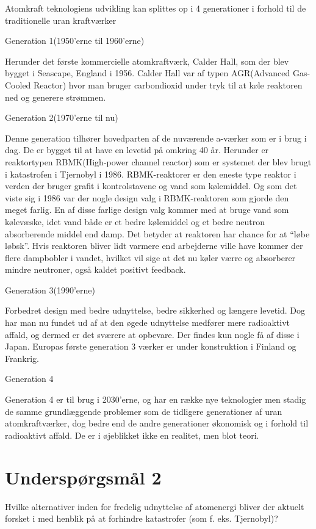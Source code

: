 \documentclass{article}
\begin{document}
Atomkraft teknologiens udvikling kan splittes op i 4 generationer i forhold til de traditionelle uran kraftværker

Generation 1(1950’erne til 1960’erne)

Herunder det første kommercielle atomkraftværk, Calder Hall, som der blev bygget i Seascape, England i 1956. Calder Hall var af typen AGR(Advanced Gas-Cooled Reactor) hvor man bruger carbondioxid under tryk til at køle reaktoren ned og generere strømmen.

Generation 2(1970’erne til nu)

Denne generation tilhører hovedparten af de nuværende a-værker som er i brug i dag. De er bygget til at have en levetid på omkring 40 år.
Herunder er reaktortypen RBMK(High-power channel reactor) som er systemet der blev brugt i katastrofen i Tjernobyl i 1986. RBMK-reaktorer er den eneste type reaktor i verden der bruger grafit i kontrolstavene og vand som kølemiddel. Og som det viste sig i 1986 var der nogle design valg i RBMK-reaktoren som gjorde den meget farlig. En af disse farlige design valg kommer med at bruge vand som kølevæske, idet vand både er et bedre kølemiddel og et bedre neutron absorberende middel end damp. Det betyder at reaktoren har chance for at “løbe løbsk”. Hvis reaktoren bliver lidt varmere end arbejderne ville have kommer der flere dampbobler i vandet, hvilket vil sige at det nu køler værre og absorberer mindre neutroner, også kaldet positivt feedback.

Generation 3(1990’erne)

Forbedret design med bedre udnyttelse, bedre sikkerhed og længere levetid. Dog har man nu fundet ud af at den øgede udnyttelse medfører mere radioaktivt affald, og dermed er det sværere at opbevare.
Der findes kun nogle få af disse i Japan. Europas første generation 3 værker er under konstruktion i Finland og Frankrig.

Generation 4

Generation 4 er til brug i 2030’erne, og har en række nye teknologier men stadig de samme grundlæggende problemer som de tidligere generationer af uran atomkraftværker, dog bedre end de andre generationer økonomisk og i forhold til radioaktivt affald. De er i øjeblikket ikke en realitet, men blot teori.


\section{Underspørgsmål 2}

Hvilke alternativer inden for fredelig udnyttelse af atomenergi bliver der aktuelt forsket i med henblik på at forhindre  katastrofer (som f. eks. Tjernobyl)?
\end{document}
